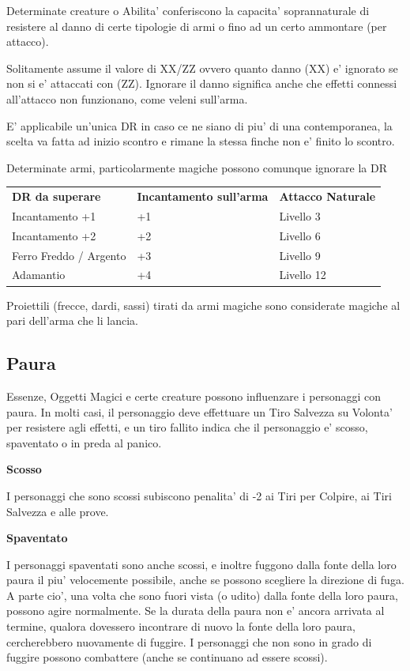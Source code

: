 \documentclass[a4paper,11pt,twoside,openany]{book}
\begin{document}
Determinate creature o Abilita' conferiscono la capacita' soprannaturale di resistere al danno di certe tipologie di armi o fino ad un certo ammontare (per attacco).

Solitamente assume il valore di XX/ZZ ovvero quanto danno (XX) e' ignorato se non si e' attaccati con (ZZ). Ignorare il danno significa anche che effetti connessi all'attacco non funzionano, come veleni sull'arma.

E' applicabile un'unica DR in caso ce ne siano di piu' di una contemporanea, la scelta va fatta ad inizio scontro e rimane la stessa finche non e' finito lo scontro.

Determinate armi, particolarmente magiche possono comunque ignorare la DR 

\bigskip

\begin{tabular}{lll}
\toprule
\textbf{DR da superare} & \textbf{Incantamento sull'arma} & \textbf{Attacco Naturale}\tabularnewline
Incantamento +1 & +1 & Livello 3\tabularnewline
Incantamento +2 & +2 & Livello 6\tabularnewline
Ferro Freddo / Argento & +3 & Livello 9\tabularnewline
Adamantio & +4 & Livello 12\tabularnewline

\end{tabular}

Proiettili (frecce, dardi, sassi) tirati da armi magiche sono considerate
magiche al pari dell'arma che li lancia.



\subsection{Paura}

\label{paura}

Essenze, Oggetti Magici e certe creature possono influenzare i personaggi con paura. In molti casi, il personaggio deve effettuare un Tiro Salvezza su Volonta' per resistere agli effetti, e un tiro fallito indica che il personaggio e' scosso, spaventato o in preda al panico.

\textbf{Scosso}

I personaggi che sono scossi subiscono penalita' di -2 ai Tiri per Colpire, ai Tiri Salvezza e alle prove.

\textbf{Spaventato}

I personaggi spaventati sono anche scossi, e inoltre fuggono dalla fonte della loro paura il piu' velocemente possibile, anche se possono scegliere la direzione di fuga. A parte cio', una volta che sono fuori vista (o udito) dalla fonte della loro paura, possono agire normalmente. Se la durata della paura non e' ancora arrivata al termine, qualora dovessero incontrare di nuovo la fonte della loro paura, cercherebbero nuovamente di fuggire. I personaggi che non sono in grado di fuggire possono combattere (anche se continuano ad essere scossi).
\end{document}
